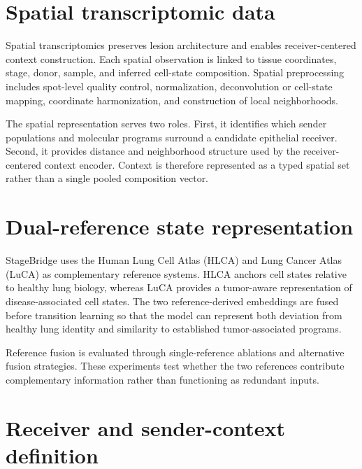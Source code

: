 
\section{Spatial transcriptomic data}

Spatial transcriptomics preserves lesion architecture and enables receiver-centered context construction. Each spatial observation is linked to tissue coordinates, stage, donor, sample, and inferred cell-state composition. Spatial preprocessing includes spot-level quality control, normalization, deconvolution or cell-state mapping, coordinate harmonization, and construction of local neighborhoods.

The spatial representation serves two roles. First, it identifies which sender populations and molecular programs surround a candidate epithelial receiver. Second, it provides distance and neighborhood structure used by the receiver-centered context encoder. Context is therefore represented as a typed spatial set rather than a single pooled composition vector.


\section{Dual-reference state representation}

StageBridge uses the Human Lung Cell Atlas (HLCA) and Lung Cancer Atlas (LuCA) as complementary reference systems. HLCA anchors cell states relative to healthy lung biology, whereas LuCA provides a tumor-aware representation of disease-associated cell states. The two reference-derived embeddings are fused before transition learning so that the model can represent both deviation from healthy lung identity and similarity to established tumor-associated programs.

Reference fusion is evaluated through single-reference ablations and alternative fusion strategies. These experiments test whether the two references contribute complementary information rather than functioning as redundant inputs.

\section{Receiver and sender-context definition}

